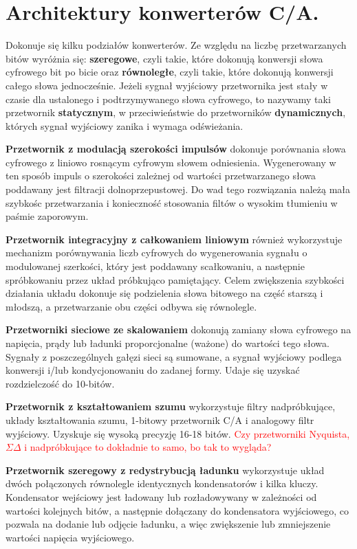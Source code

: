 \documentclass[10pt,a4paper]{report}
\begin{document}
	\section{Architektury konwerterów C/A. \cite{cmosanal} \cite{plassche}}
	{	Dokonuje się kilku podziałów konwerterów. Ze względu na liczbę przetwarzanych bitów wyróżnia się: \textbf{szeregowe}, czyli takie, które dokonują konwersji słowa cyfrowego bit po bicie oraz \textbf{równoległe}, czyli takie, które dokonują konwersji całego słowa jednocześnie. Jeżeli sygnał wyjściowy przetwornika jest stały w czasie dla ustalonego i podtrzymywanego słowa cyfrowego, to nazywamy taki przetwornik \textbf{statycznym}, w przeciwieństwie do przetworników \textbf{dynamicznych}, których sygnał wyjściowy zanika i wymaga odświeżania. }
	
	{	\textbf{Przetwornik z modulacją szerokości impulsów} dokonuje porównania słowa cyfrowego z liniowo rosnącym cyfrowym słowem odniesienia. Wygenerowany w ten sposób impuls o szerokości zależnej od wartości przetwarzanego słowa poddawany jest filtracji dolnoprzepustowej. Do wad tego rozwiązania należą mała szybkośc przetwarzania i konieczność stosowania filtów o wysokim tłumieniu w paśmie zaporowym. }
	
	{	\textbf{Przetwornik integracyjny z całkowaniem liniowym} również wykorzystuje mechanizm porównywania liczb cyfrowych do wygenerowania sygnału o modulowanej szerkości, który jest poddawany scałkowaniu, a następnie spróbkowaniu przez układ próbkująco pamiętający. Celem zwiększenia szybkości działania układu dokonuje się podzielenia słowa bitowego na część starszą i młodszą, a przetwarzanie obu części odbywa się równolegle. }
	
	{	\textbf{Przetworniki sieciowe ze skalowaniem} dokonują zamiany słowa cyfrowego na napięcia, prądy lub ładunki proporcjonalne (ważone) do wartości tego słowa. Sygnały z poszczególnych gałęzi sieci są sumowane, a sygnał wyjściowy podlega konwersji i/lub kondycjonowaniu do zadanej formy. Udaje się uzyskać rozdzielczość do 10-bitów.}
	
	{	\textbf{Przetwornik z kształtowaniem szumu} wykorzystuje filtry nadpróbkujące, układy kształtowania szumu, 1-bitowy przetwornik C/A i analogowy filtr wyjściowy. Uzyskuje się wysoką precyzję 16-18 bitów. \textcolor{red}{Czy przetworniki Nyquista, $\Sigma \Delta$ i nadpróbkujące to dokładnie to samo, bo tak to wygląda?} }
	
	{	\textbf{Przetwornik szeregowy z redystrybucją ładunku} wykorzystuje układ dwóch połączonych równolegle identycznych kondensatorów i kilka kluczy. Kondensator wejściowy jest ładowany lub rozładowywany w zależności od wartości kolejnych bitów, a następnie dołączany do kondensatora wyjściowego, co pozwala na dodanie lub odjęcie ładunku, a więc zwiększenie lub zmniejszenie wartości napięcia wyjściowego.
	}
	
\end{document}

